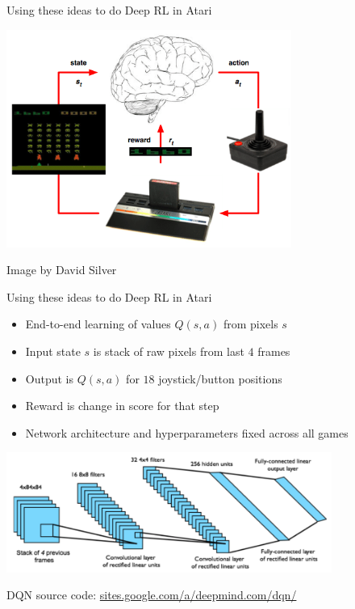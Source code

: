 \begin{frame}[c]{Using these ideas to do Deep RL in Atari}
	
\centering
\includegraphics[width=0.7\textwidth]{images/atari_deep_rl.png}

\begin{flushright}
	Image by David Silver
\end{flushright}
	
\end{frame}
\begin{frame}[c]{Using these ideas to do Deep RL in Atari}
	
\begin{itemize}
	\item End-to-end learning of values $Q(s, a)$ from pixels $s$
	\item Input state $s$ is stack of raw pixels from last $4$ frames
	\item Output is $Q(s, a)$ for $18$ joystick/button positions
	\item Reward is change in score for that step
	\item Network architecture and hyperparameters fixed across all games
\end{itemize}

\centering
\includegraphics[width=0.8\textwidth]{images/atari_dqn_arch.png}

\begin{flushright}
	\footnotesize
	\vspace{-0.1cm}
	DQN source code: \url{sites.google.com/a/deepmind.com/dqn/}
\end{flushright}
	
\end{frame}
